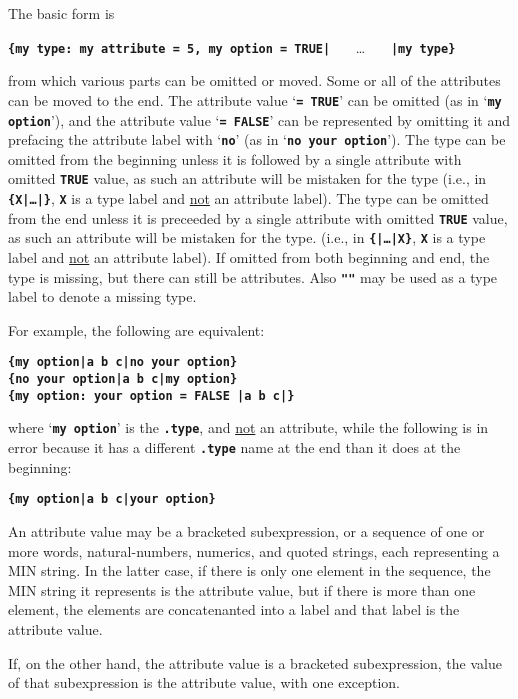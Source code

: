 \documentclass[12pt]{article}
\newcommand{\TT}[1]{{\tt \bfseries #1}}
\begin{document}
The basic form is
\begin{center}
\TT{\{my type: my attribute = 5, my option = TRUE|} ~~~\ldots~~~
    \TT{|my type\}} \\
\end{center}
from which various parts can be omitted or moved.  Some or all of the
attributes can be moved to the end.
The attribute value `\TT{= TRUE}' can be omitted (as in
`\TT{my option}'), and the attribute value `\TT{= FALSE}' can be represented
by omitting it and prefacing the attribute label with `\TT{no}'
(as in `\TT{no your option}').
The type can be omitted from the beginning unless it is followed by
a single attribute with omitted \TT{TRUE} value, as such an attribute
will be mistaken for the type (i.e., in \TT{\{X|\ldots|\}}, \TT{X} is
a type label and \underline{not} an attribute label).
The type can be omitted from the end unless it is preceeded
by a single attribute with omitted \TT{TRUE} value, as such an attribute
will be mistaken for the type.
(i.e., in \TT{\{|\ldots|X\}}, \TT{X} is
a type label and \underline{not} an attribute label).
If omitted from both
beginning and end, the type is missing, but there can still be
attributes.  Also \TT{""} may be used as a type label to denote
a missing type.

For example, the following are equivalent:
\begin{center}
\TT{\{my option|a b c|no your option\}} \\
\TT{\{no your option|a b c|my option\}} \\
\TT{\{my option:~your option = FALSE |a b c|\}}
\end{center}

where `\TT{my option}' is the \TT{.type}, and \underline{not}
an attribute,
while the following is in error because it has a different \TT{.type} name
at the end than it does at the beginning:
\begin{center}
\TT{\{my option|a b c|your option\}} \\
\end{center}

An attribute value may be a bracketed subexpression, or a sequence
of one or more words, natural-numbers, numerics, and quoted strings, each
representing a MIN string.
In the latter case, if there is only
one element in the sequence, the MIN string it represents is the
attribute value, but if there is more than one element, the elements
are concatenanted into a label and that label is the attribute value.

If, on the other hand, the attribute value is a bracketed subexpression,
the value of that subexpression is the attribute value, with one exception.
\end{document}
